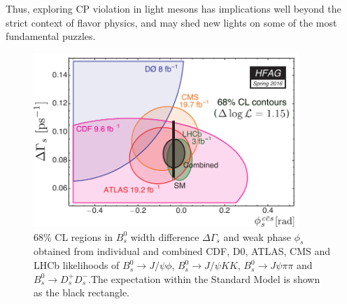 Thus, exploring CP violation in light mesons has implications well beyond the
strict context of flavor physics, and may shed new lights on some of the most
fundamental puzzles.

\begin{figure}[ptb]
\begin{center}
\includegraphics[width=10cm]{hfag_Spring2016_DGsphis_zoom.pdf}
\end{center}
\caption{68\% CL regions in $B^{0}_{s}$ width difference $\Delta\Gamma_{s}$
and weak phase $\phi_{s}$ obtained from individual and combined CDF, D0,
ATLAS, CMS and LHCb likelihoods of $B^{0}_{s}\to J/\psi\phi$, $B^{0}_{s}\to
J/\psi KK$, $B^{0}_{s}\to J\psi\pi\pi$ and $B^{0}_{s}\to D_{s}^{+}D_{s}^{-}%
$.The expectation within the Standard Model is shown as the black rectangle.}%
\label{figphis}%
\end{figure}

%